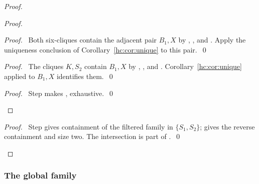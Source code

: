 \begin{mergedproofsection}
\begin{proof}
\begin{proof}
  \begin{proof}\pf\ Both six-cliques contain the adjacent pair
   $B_1,X$ by , , and
   . Apply the uniqueness conclusion of
   Corollary~\ref{hc:cor:unique} to this pair.~\qed\end{proof}
  \begin{proof}\pf\ The cliques $K,S_2$ contain $B_1,X$ by
   , , and .
   Corollary~\ref{hc:cor:unique} applied to $B_1,X$ identifies them.~\qed\end{proof}
  \qedstep
  \begin{proof}\pf\ Step  makes
   ,  exhaustive.~\qed\end{proof}
 \end{proof}
 \qedstep
 \begin{proof}\pf\ Step  gives containment
  of the filtered family in $\{S_1,S_2\}$; 
  gives the reverse containment and size two. The intersection
  is part of .~\qed\end{proof}
\end{proof}

\subsubsection{The global family}


\end{mergedproofsection}
